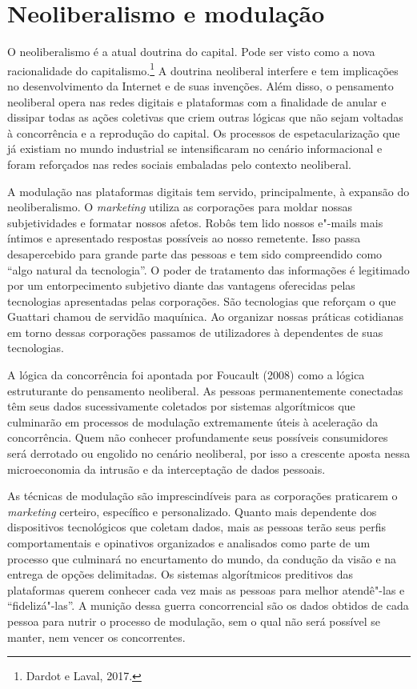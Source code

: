 \section{Neoliberalismo e modulação}

O neoliberalismo é a atual doutrina do capital. Pode ser visto como a
nova racionalidade do capitalismo.\footnote{Dardot e Laval, 2017.} A doutrina
neoliberal interfere e tem implicações no desenvolvimento da Internet e
de suas invenções. Além disso, o pensamento neoliberal opera nas redes
digitais e plataformas com a finalidade de anular e dissipar todas as
ações coletivas que criem outras lógicas que não sejam voltadas à
concorrência e a reprodução do capital. Os processos de
espetacularização que já existiam no mundo industrial se intensificaram
no cenário informacional e foram reforçados nas redes sociais embaladas
pelo contexto neoliberal.

A modulação nas plataformas digitais tem servido, principalmente, à
expansão do neoliberalismo. O \emph{marketing} utiliza as corporações para
moldar nossas subjetividades e formatar nossos afetos. Robôs tem lido
nossos e"-mails mais íntimos e apresentado respostas possíveis ao nosso
remetente. Isso passa desapercebido para grande parte das pessoas e tem
sido compreendido como ``algo natural da tecnologia''. O poder de
tratamento das informações é legitimado por um entorpecimento subjetivo
diante das vantagens oferecidas pelas tecnologias apresentadas pelas
corporações. São tecnologias que reforçam o que Guattari chamou de
servidão maquínica. Ao organizar nossas práticas cotidianas em torno
dessas corporações passamos de utilizadores à dependentes de suas
tecnologias.

A lógica da concorrência foi apontada por Foucault (2008) como a lógica
estruturante do pensamento neoliberal. As pessoas permanentemente
conectadas têm seus dados sucessivamente coletados por sistemas
algorítmicos que culminarão em processos de modulação extremamente úteis
à aceleração da concorrência. Quem não conhecer profundamente seus
possíveis consumidores será derrotado ou engolido no cenário neoliberal,
por isso a crescente aposta nessa microeconomia da intrusão e da
interceptação de dados pessoais.

As técnicas de modulação são imprescindíveis para as corporações
praticarem o \emph{marketing} certeiro, específico e personalizado. Quanto
mais dependente dos dispositivos tecnológicos que coletam dados, mais as
pessoas terão seus perfis comportamentais e opinativos organizados e
analisados como parte de um processo que culminará no encurtamento do
mundo, da condução da visão e na entrega de opções delimitadas. Os
sistemas algorítmicos preditivos das plataformas querem conhecer cada
vez mais as pessoas para melhor atendê"-las e ``fidelizá"-las''. A munição
dessa guerra concorrencial são os dados obtidos de cada pessoa para
nutrir o processo de modulação, sem o qual não será possível se manter,
nem vencer os concorrentes.


